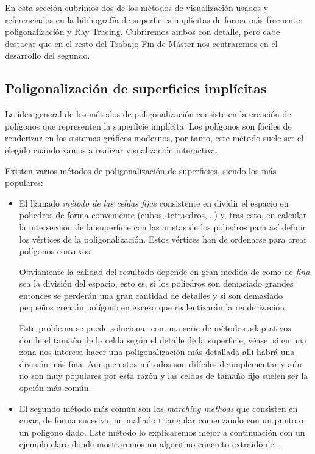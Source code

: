 En esta sección cubrimos dos de los métodos de visualización usados y referenciados en la bibliografía de superficies implícitas de forma más frecuente: poligonalización y Ray Tracing. Cubriremos ambos con detalle, pero cabe destacar que en el resto del Trabajo Fin de Máster nos centraremos en el desarrollo del segundo.

\subsection{Poligonalización de superficies implícitas}

La idea general de los métodos de poligonalización consiste en la creación de polígonos que representen la superficie implícita. Los polígonos son fáciles de renderizar en los sistemas gráficos modernos, por tanto, este método suele ser el elegido cuando vamos a realizar visualización interactiva.

Existen varios métodos  de poligonalización de superficies, siendo los más populares:
\begin{itemize}
\item El llamado{ \em método de las celdas fijas}\cite{Bloomenthal90} consistente en dividir el espacio en poliedros de forma conveniente (cubos, tetraedros,...) y, tras esto, en calcular la intersección de la superficie con  las aristas de los poliedros para así definir los vértices de la poligonalización. Estos vértices han de ordenarse para crear polígonos convexos.

Obviamente la calidad del resultado depende en gran medida de como de { \em fina} sea la división del espacio, esto es, si los poliedros son demasiado grandes entonces se perderán una gran cantidad de detalles y si son demasiado pequeños crearán polígono en exceso que realentizarán la renderización.

Este problema se puede solucionar con una serie de métodos adaptativos donde el tamaño de la celda según el detalle de la superficie, véase, si en una zona nos interesa hacer una poligonalización más detallada allí habrá una división más fina. Aunque estos métodos son difíciles de implementar y aún no son muy populares por esta razón y las celdas de tamaño fijo suelen ser la opción más común.

\item El segundo método más común son los{ \em marching methods} que consisten en crear, de forma sucesiva, un mallado triangular comenzando con un punto o un polígono dado. Este método lo explicaremos mejor a continuación con un ejemplo claro donde mostraremos un algoritmo concreto extraído de \cite{Hartmann03}.
\end{itemize}

